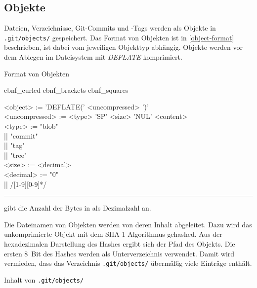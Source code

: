 \documentclass[
	nonacm,%
	screen,%
	sigplan,
]{acmart}
\newenvironment{myebnf}[1][4em]{%
	\begin{minipage}{.9\linewidth}%
		\expandafter \undef \csname ebnf_curled\endcsname
		\expandafter \undef \csname ebnf_brackets\endcsname
		\expandafter \undef \csname ebnf_squares\endcsname
		\begin{ebnf}[#1]%
}{%
		\end{ebnf}%
	\end{minipage}%
}
\begin{document}
\subsection{Objekte}

Dateien, Verzeichnisse, Git-Commits und -Tags werden als Objekte in \texttt{.git/objects/}  gespeichert. Das Format von Objekten ist in \autoref{object-format} beschrieben,  ist dabei vom jeweiligen Objekttyp  abhängig. Objekte werden vor dem Ablegen im Dateisystem mit \emph{DEFLATE} \cite{zlib} komprimiert.

\begin{format}
	\caption{Format von Objekten}%
	\label{object-format}%
	\begin{myebnf}[8em]
		<object> := 'DEFLATE(' <uncompressed> ')' \\
		<uncompressed> := <type> 'SP' <size> 'NUL' <content> \\
		<type> := "blob" \\
			|| "commit" \\
			|| "tag" \\
			|| "tree" \\
		<size> := <decimal> \\
		<decimal> := "0" \\
			|| /[1-9][0-9]*/
	\end{myebnf}

	\vspace{\fboxsep}%
	\hrule
	\vspace{\fboxsep}

	\begin{minipage}{\dimexpr \linewidth -2\fboxsep \relax}
		 gibt die Anzahl der Bytes in  als Dezimalzahl an.
	\end{minipage}
\end{format}

Die Dateinamen von Objekten werden von deren Inhalt abgeleitet. Dazu wird das unkomprimierte Objekt mit dem SHA-1-Algorithmus \cite{sha1} gehashed. \cite{git-sha1-then-zlib} Aus der hexadezimalen Darstellung des Hashes ergibt sich der Pfad des Objekts. Die ersten 8~Bit des Hashes werden als Unterverzeichnis verwendet. Damit wird vermieden, dass das Verzeichnis \texttt{.git/objects/} übermäßig viele Einträge enthält.

\begin{example}
	\caption{Inhalt von \texttt{.git/objects/}}%
	\label{git-objects}%
\end{example}
\end{document}
